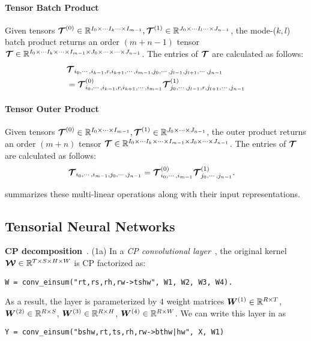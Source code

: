 \paragraph{Tensor Batch Product}
Given tensors $\bm{\mathcal{T}}^{(0)}\in\mathbb{R}^{I_0\times \cdots I_{k} \cdots \times I_{m-1}}, \bm{\mathcal{T}}^{(1)}\in\mathbb{R}^{J_0 \times \cdots I_l \cdots \times J_{n-1}}$, the mode-($k,l$) batch product returns an order $(m+n-1)$ tensor $\bm{\mathcal{T}}\in\mathbb{R}^{I_0\times\cdots I_k \times \cdots \times I_{m-1}\times J_0 \times \cdots \times \cdots\times J_{n-1}}$. The entries of $\bm{\mathcal{T}}$ are calculated as follows:
\begin{align*}
& \bm{\mathcal{T}}_{i_0, \cdots, i_{k-1}, r, i_{k+1}, \cdots, i_{m-1}, j_0, \cdots, j_{l-1}, j_{l+1}, \cdots, j_{n-1}} \\
	&= \bm{\mathcal{T}}^{(0)}_{i_0, \cdots, i_{k-1}, r, i_{k+1}, \cdots, i_{m-1}} \bm{\mathcal{T}}^{(1)}_{j_0, \cdots, j_{l-1},r, j_{l+1}, \cdots, j_{n-1}}
\end{align*}

\paragraph{Tensor Outer Product}
 Given tensors $\bm{\mathcal{T}}^{(0)}\in\mathbb{R}^{I_0\times \cdots \times I_{m-1}}, \bm{\mathcal{T}}^{(1)}\in\mathbb{R}^{J_0 \times \cdots \times J_{n-1}}$, the outer product returns an order $(m+n)$ tensor $\bm{\mathcal{T}}\in\mathbb{R}^{I_0\times\cdots I_k \times \cdots \times I_{m-1}\times J_0 \times \cdots \times J_{n-1}}$. The entries of $\bm{\mathcal{T}}$ are calculated as follows:
\begin{align}
\bm{\mathcal{T}}_{i_0, \cdots, i_{m-1}, j_0, \cdots, j_{n-1}}
	&= \bm{\mathcal{T}}^{(0)}_{i_0, \cdots, i_{m-1}} \bm{\mathcal{T}}^{(1)}_{j_0, \cdots, j_{n-1}}.
\end{align}

 summarizes these multi-linear operations along with their \conveinsum input representations. 

\subsection{Tensorial Neural Networks}
\label{app-sub:TNN}

\textbf{CP decomposition}~\citep{kolda2009tensor}.
(1a) In a {\em CP convolutional layer}~\citep{lebedev2015speeding}, the original kernel $\bm{\mathcal{W}} \in \mathbb{R}^{T \times S \times H \times W}$ is CP factorized as:
\begin{lstlisting}
W = conv_einsum("rt,rs,rh,rw->tshw", W1, W2, W3, W4).
\end{lstlisting}
\vspace{-0.5em}
As a result, the layer is parameterized by $4$ weight matrices $\bm{W}^{(1)} \in \mathbb{R}^{R \times T}$, $\bm{W}^{(2)} \in \mathbb{R}^{R \times S}$, $\bm{W}^{(3)} \in \mathbb{R}^{R \times H}$, $\bm{W}^{(4)} \in \mathbb{R}^{R \times W}$. We can write this layer in \conveinsum as
\begin{lstlisting}
Y = conv_einsum("bshw,rt,ts,rh,rw->bthw|hw", X, W1)
\end{lstlisting}
\vspace{-0.5em}

